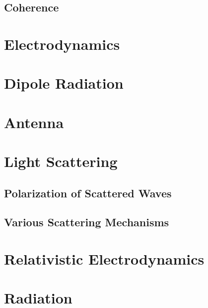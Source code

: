 \documentclass[a4paper]{article}
\theoremstyle{new}
\begin{document}
\newpage
\subsection{Coherence}


\newpage
\section{Electrodynamics}



\newpage
\section{Dipole Radiation}


\newpage
\section{Antenna}

\newpage
\section{Light Scattering}
\subsection{Polarization of Scattered Waves}
\subsection{Various Scattering Mechanisms}

\newpage
\section{Relativistic Electrodynamics}

\newpage
\section{Radiation}
\end{document}
